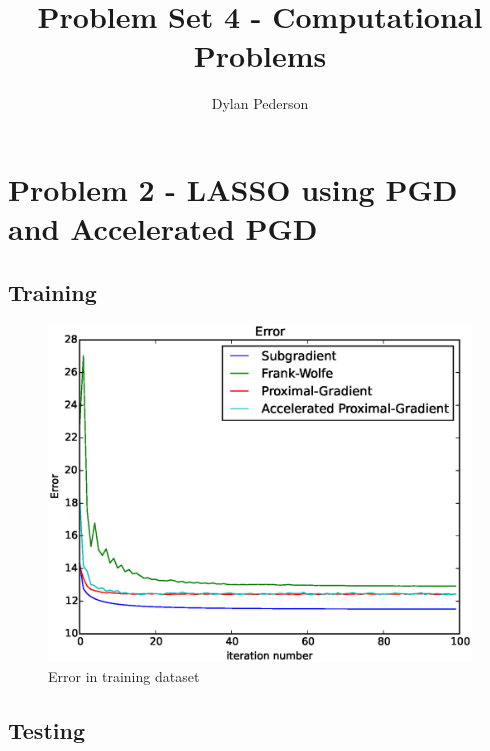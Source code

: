 \documentclass{article}
\begin{document}
\title{Problem Set 4 - Computational Problems}
\author{Dylan Pederson}

\maketitle

\section{Problem 2 - LASSO using PGD and Accelerated PGD}

\subsection{Training}

\begin{figure}[h!]
\centering
\includegraphics[scale=0.5]{error_train.eps}
\caption{Error in training dataset}
\end{figure}

\subsection{Testing}
\end{document}
